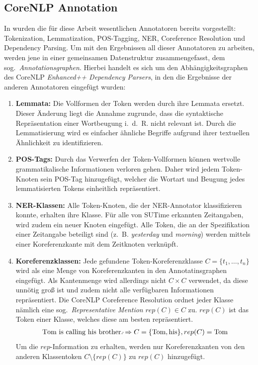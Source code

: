 \subsection{CoreNLP Annotation}%
\label{sec:text2kg:nlp:corenlp}

In  wurden die für diese Arbeit wesentlichen Annotatoren bereits vorgestellt: Tokenization, Lemmatization, POS-Tagging, NER, Coreference Resolution und Dependency Parsing.
Um mit den Ergebnissen all dieser Annotatoren zu arbeiten, werden jene in einer gemeinsamen Datenstruktur zusammengefasst, dem sog.\ \textit{Annotations\-graphen}.
Hierbei handelt es sich um den Abhängigkeitsgraphen des CoreNLP \textit{Enhanced++ Dependency Parsers}, in den die Ergebnisse der anderen Annotatoren eingefügt wurden:
\begin{enumerate}
	\item \textbf{Lemmata:}
		Die Vollformen der Token werden durch ihre Lemmata ersetzt.
		Dieser Änderung liegt die Annahme zugrunde, dass die syntaktische Repräsentation einer Wortbeugung i.~d.~R. nicht relevant ist.
		Durch die Lemmatisierung wird es einfacher ähnliche Begriffe aufgrund ihrer textuellen Ähnlichkeit zu identifizieren.
	\item \textbf{POS-Tags:}
		Durch das Verwerfen der Token-Vollformen können wertvolle grammatikalische Informationen verloren gehen.
		Daher wird jedem Token-Knoten sein POS-Tag hinzugefügt, welcher die Wortart und Beugung jedes lemmatisierten Tokens einheitlich repräsentiert.
	\item \textbf{NER-Klassen:}
		Alle Token-Knoten, die der NER-Annotator klassifizieren konnte, erhalten ihre Klasse.
		Für alle von SUTime erkannten Zeitangaben, wird zudem ein neuer Knoten eingefügt.
		Alle Token, die an der Spezifikation einer Zeitangabe beteiligt sind (z.~B. \textit{yesterday} und \textit{morning}) werden mittels einer Koreferenzkante mit dem Zeitknoten verknüpft.
	\item \textbf{Koreferenzklassen:}
		Jede gefundene Token-Koreferenzklasse $C = \{t_1, \dots, t_n\}$ wird als eine Menge von Koreferenzkanten in den Annotatinsgraphen eingefügt.
		Als Kantenmenge wird allerdings nicht $C \times C$ verwendet, da diese unnötig groß ist und zudem nicht alle verfügbaren Informationen repräsentiert.
		Die CoreNLP Coreference Resolution ordnet jeder Klasse nämlich eine sog.\ \textit{Representative Mention} $rep(C) \in C$ zu.
		$rep(C)$ ist das Token einer Klasse, welches diese am besten repräsentiert.
		\begin{align*}
			\text{T}\tikzmark{toma}\text{om is calling hi}\tikzmark{tomb}\text{s brother.}
			\begin{tikzpicture}[overlay,remember picture]
				\draw[-,shorten >=3pt,shorten <=3pt] (toma.center) to[bend right] (tomb.center);
			\end{tikzpicture}
			\Rightarrow
			C = \{\text{Tom}, \text{his}\}, rep(C) = \text{Tom}
		\end{align*}
		Um die $rep$-Information zu erhalten, werden nur Koreferenzkanten von den anderen Klassentoken $C \setminus \{rep(C)\}$ zu $rep(C)$ hinzugefügt.
\end{enumerate}

